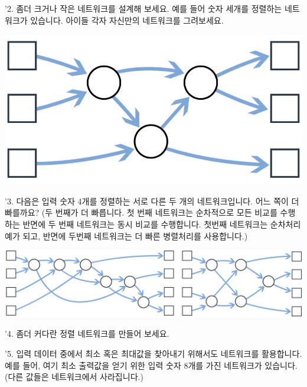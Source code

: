 \documentclass[]{article}
\begin{document}
'2. 좀더 크거나 작은 네트워크를 설계해 보세요. 예를 들어 숫자 세개를
정렬하는 네트워크가 있습니다. 아이들 각자 자신만의 네트워크를
그려보세요.

\includegraphics{csunplugged/02-part/img/ch08-parallel/08-parallel-03-own-network.png}

'3. 다음은 입력 숫자 4개를 정렬하는 서로 다른 두 개의 네트워크입니다.
어느 쪽이 더 빠를까요? (두 번째가 더 빠릅니다. 첫 번째 네트워크는
순차적으로 모든 비교를 수행하는 반면에 두 번째 네트워크는 동시 비교를
수행합니다. 첫번째 네트워크는 순차처리 예가 되고, 반면에 두번째
네트워크는 더 빠른 병렬처리를 사용합니다.)

\includegraphics{csunplugged/02-part/img/ch08-parallel/08-parallel-04-two-networks.png}

'4. 좀더 커다란 정렬 네트워크를 만들어 보세요.

'5. 입력 데이터 중에서 최소 혹은 최대값을 찾아내기 위해서도 네트워크를
활용합니다. 예를 들어, 여기 최소 출력값을 얻기 위한 입력 숫자 8개를 가진
네트워크가 있습니다. (다른 값들은 네트워크에서 사라집니다.)
\end{document}
